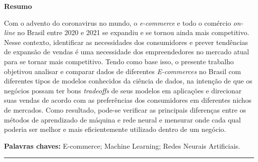 \documentclass[12pt,a4paper]{article}
\begin{document}
\begin{center}
    {\large \textbf{Resumo}}
\end{center}
Com o advento do coronavirus no mundo, o \textit{e-commerce} e todo o comércio \textit{on-line} no Brasil entre 2020 e 2021 se expandiu e se tornou ainda mais competitivo. Nesse contexto, identificar as necessidades dos consumidores e prever tendências de expansão de vendas é uma necessidade dos empreendedores no mercado atual para se tornar mais competitivo. Tendo como base isso, o presente trabalho objetivou analisar e comparar dados de diferentes \textit{E-commerces} no Brasil com diferentes tipos de modelos conhecidos da ciência de dados, na intenção de que os negócios possam ter bons \textit{tradeoffs} de seus modelos em aplicações e direcionar suas vendas de acordo com as preferências dos consumidores em diferentes nichos de mercados. Como resultado, pode-se verificar as principais diferenças entre os métodos de aprendizado de máquina e rede neural e mensurar onde cada qual poderia ser melhor e mais eficientemente utilizado dentro de um negócio. 

\begin{flushleft}
    {\large \textbf{Palavras chaves:}} E-commerce; Machine Learning; Redes Neurais Artificiais.
\end{flushleft}

\hrule
\hspace{0.5em}









\nocite{*}
\end{document}
